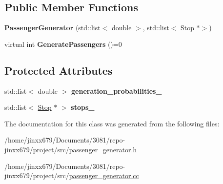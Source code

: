 \subsection*{Public Member Functions}
\begin{DoxyCompactItemize}
\item 
\mbox{\label{classPassengerGenerator_a33eeed8b68d5d596ceef5381c697e49d}} 
{\bfseries Passenger\+Generator} (std\+::list$<$ double $>$, std\+::list$<$ \hyperlink{classStop}{Stop} $\ast$$>$)
\item 
\mbox{\label{classPassengerGenerator_ad2db96a13b34fcf35977287c06b31d47}} 
virtual int {\bfseries Generate\+Passengers} ()=0
\end{DoxyCompactItemize}
\subsection*{Protected Attributes}
\begin{DoxyCompactItemize}
\item 
\mbox{\label{classPassengerGenerator_a855471e5532fec3f387a6340f928d43a}} 
std\+::list$<$ double $>$ {\bfseries generation\+\_\+probabilities\+\_\+}
\item 
\mbox{\label{classPassengerGenerator_ab09ab7ca9104385ae007d05a6e957884}} 
std\+::list$<$ \hyperlink{classStop}{Stop} $\ast$ $>$ {\bfseries stops\+\_\+}
\end{DoxyCompactItemize}


The documentation for this class was generated from the following files\+:\begin{DoxyCompactItemize}
\item 
/home/jinxx679/\+Documents/3081/repo-\/jinxx679/project/src/\hyperlink{passenger__generator_8h}{passenger\+\_\+generator.\+h}\item 
/home/jinxx679/\+Documents/3081/repo-\/jinxx679/project/src/\hyperlink{passenger__generator_8cc}{passenger\+\_\+generator.\+cc}\end{DoxyCompactItemize}
